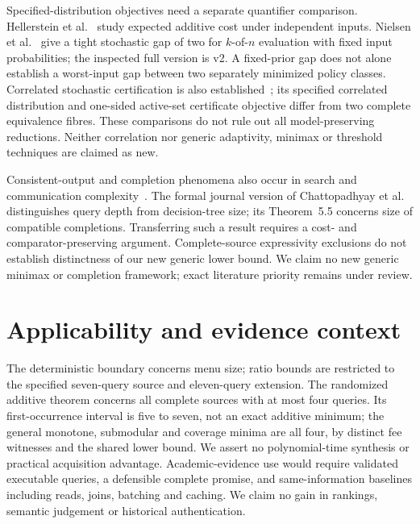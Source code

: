 \documentclass[pdflatex,sn-mathphys-num]{sn-jnl}
\theoremstyle{thmstyleone}
\theoremstyle{thmstylethree}
\theoremstyle{thmstyletwo}
\begin{document}
Specified-distribution objectives need a separate quantifier comparison.
Hellerstein et al.~\cite{hellerstein2022adaptivity} study expected additive
cost under independent inputs. Nielsen et al.~\cite{nielsen2025kofn}
give a tight stochastic gap of two for $k$-of-$n$ evaluation with fixed
input probabilities; the inspected full version is v2. A fixed-prior
gap does not alone establish a worst-input gap between two separately
minimized policy classes. Correlated stochastic certification is also
established~\cite{ghuge2026correlations}; its specified correlated
distribution and one-sided active-set certificate objective differ from
two complete equivalence fibres. These comparisons do not rule out all
model-preserving reductions. Neither correlation nor generic adaptivity,
minimax or threshold techniques are claimed as new.

Consistent-output and completion phenomena also occur in search and communication complexity~\cite{chattopadhyay2025pseudo,goos2026pseudo,watson2026pseudo}. The formal journal version of Chattopadhyay et al. distinguishes query depth from decision-tree size; its Theorem~5.5 concerns size of compatible completions. Transferring such a result requires a cost- and comparator-preserving argument. Complete-source expressivity exclusions do not establish distinctness of our new generic lower bound. We claim no new generic minimax or completion framework; exact literature priority remains under review.

\section{Applicability and evidence context}\label{app:scope-context}
The deterministic boundary concerns menu size; ratio bounds are restricted to the specified seven-query source and eleven-query extension. The randomized additive theorem concerns all complete sources with at most four queries. Its first-occurrence interval is five to seven, not an exact additive minimum; the general monotone, submodular and coverage minima are all four, by distinct fee witnesses and the shared lower bound. We assert no polynomial-time synthesis or practical acquisition advantage. Academic-evidence use would require validated executable queries, a defensible complete promise, and same-information baselines including reads, joins, batching and caching. We claim no gain in rankings, semantic judgement or historical authentication.
\end{document}
